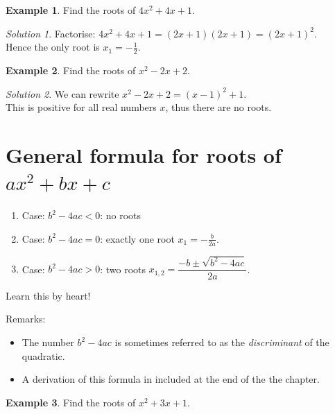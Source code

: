 \documentclass[
  12pt,
  oneside]{book}
\providecommand{\tightlist}{%
  \setlength{\itemsep}{0pt}\setlength{\parskip}{0pt}}
\theoremstyle{definition}
\theoremstyle{definition}
\newtheorem{example}{Example}[chapter]
\theoremstyle{definition}
\theoremstyle{definition}
\theoremstyle{remark}
\newtheorem*{solution}{Solution}
\begin{document}
\begin{example}
Find the roots of \(4x^2+4x+1\).
\end{example}

\begin{solution}
Factorise: \(4x^2+4x+1=(2x+1)(2x+1)=(2x+1)^2\).\\
Hence the only root is \(x_1=-\frac{1}{2}\).
\end{solution}

\begin{example}
Find the roots of \(x^2-2x+2\).
\end{example}

\begin{solution}
We can rewrite \(x^2-2x+2=(x-1)^2+1\).\\
This is positive for all real numbers \(x\), thus there are no roots.
\end{solution}

\hypertarget{general-formula-for-roots-of-ax2bxc}{%
\section{\texorpdfstring{General formula for roots of \(ax^2+bx+c\)}{General formula for roots of ax\^{}2+bx+c}}\label{general-formula-for-roots-of-ax2bxc}}

\begin{enumerate}
\def\labelenumi{\arabic{enumi}.}
\tightlist
\item
  Case: \(b^2-4ac < 0\): no roots
\item
  Case: \(b^2-4ac = 0\): exactly one root \(x_1=-\frac{b}{2a}\).
\item
  Case: \(b^2-4ac > 0\): two roots \(x_{1,2}=\dfrac{-b\pm\sqrt{b^2-4ac}}{2a}\).
\end{enumerate}

Learn this by heart!

Remarks:

\begin{itemize}
\tightlist
\item
  The number \(b^2-4ac\) is sometimes referred to as the \emph{discriminant} of the quadratic.
\item
  A derivation of this formula in included at the end of the the chapter.
\end{itemize}

\begin{example}
Find the roots of \(x^2+3x+1\).
\end{example}
\end{document}
